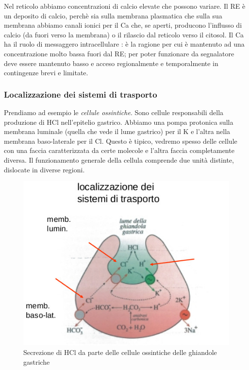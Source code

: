 \documentclass[a4paper,12pt]{article}
\begin{document}
Nel reticolo abbiamo concentrazioni di calcio elevate
che possono variare. Il RE è un deposito di calcio, perchè sia sulla membrana plasmatica che sulla sua membrana abbiamo canali ionici per il Ca che, se aperti, producono l'influsso di calcio (da fuori verso la membrana) o il rilascio dal reticolo verso il citosol. 
Il Ca ha il ruolo di messaggero intracellulare : è la ragione per cui è mantenuto ad una concentrazione molto bassa fuori dal RE; per poter funzionare da segnalatore deve essere mantenuto basso e acceso regionalmente e temporalmente in contingenze brevi e limitate.

\subsubsection{Localizzazione dei sistemi di trasporto}

Prendiamo ad esempio le \emph{cellule ossintiche}. Sono cellule responsabili della produzione di
HCl nell’epitelio gastrico. Abbiamo una pompa protonica sulla membrana luminale (quella che vede il lume gastrico) per il K e l’altra nella membrana baso-laterale per il Cl. Questo è tipico, vedremo spesso delle cellule con una faccia caratterizzata da certe molecole e l’altra
faccia completamente diversa.
Il funzionamento generale della cellula comprende due unità distinte, dislocate in diverse
regioni.
\begin{figure}[H]
\centering
\includegraphics[scale=0.3]{immagine/local.jpg}
\caption{Secrezione di HCl da parte delle cellule ossintiche delle ghiandole gastriche}
\end{figure}
\end{document}
